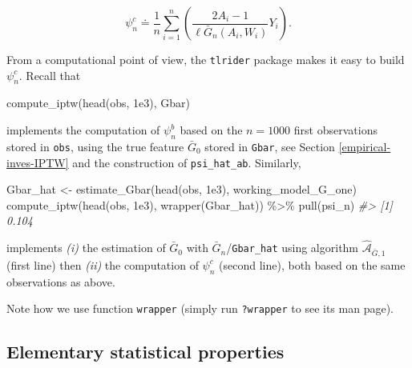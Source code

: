 \documentclass[
  11pt,
  openright,twoside]{book}
\newenvironment{Shaded}{\begin{snugshade}}{\end{snugshade}}
\newcommand{\CommentTok}[1]{\textcolor[rgb]{0.56,0.35,0.01}{\textit{#1}}}
\newcommand{\FloatTok}[1]{\textcolor[rgb]{0.00,0.00,0.81}{#1}}
\newcommand{\FunctionTok}[1]{\textcolor[rgb]{0.00,0.00,0.00}{#1}}
\newcommand{\NormalTok}[1]{#1}
\newcommand{\OtherTok}[1]{\textcolor[rgb]{0.56,0.35,0.01}{#1}}
\newcommand{\SpecialCharTok}[1]{\textcolor[rgb]{0.00,0.00,0.00}{#1}}
\newcommand{\Algo}{\widehat{\mathcal{A}}}
\newcommand{\defq}{\doteq}
\newcommand{\Gbar}{\bar{G}}
\theoremstyle{definition}
\theoremstyle{definition}
\theoremstyle{definition}
\theoremstyle{definition}
\theoremstyle{remark}
\begin{document}
\begin{equation*}
\psi_{n}^{c}   \defq   \frac{1}{n}    \sum_{i=1}^{n}   \left(\frac{2A_{i}   -
1}{\ell\Gbar_{n}(A_{i}, W_{i})} Y_{i}\right).
\end{equation*}

From a computational point of view, the \texttt{tlrider} package makes it easy to
build \(\psi_{n}^{c}\). Recall that

\begin{Shaded}
\begin{Highlighting}[]
\FunctionTok{compute\_iptw}\NormalTok{(}\FunctionTok{head}\NormalTok{(obs, }\FloatTok{1e3}\NormalTok{), Gbar)}
\end{Highlighting}
\end{Shaded}

implements the computation of \(\psi_{n}^{b}\) based on the \(n=1000\) first
observations stored in \texttt{obs}, using the true feature \(\Gbar_{0}\) stored in
\texttt{Gbar}, see Section \ref{empirical-inves-IPTW} and the construction of
\texttt{psi\_hat\_ab}. Similarly,

\begin{Shaded}
\begin{Highlighting}[]
\NormalTok{Gbar\_hat }\OtherTok{\textless{}{-}} \FunctionTok{estimate\_Gbar}\NormalTok{(}\FunctionTok{head}\NormalTok{(obs, }\FloatTok{1e3}\NormalTok{), working\_model\_G\_one)}
\FunctionTok{compute\_iptw}\NormalTok{(}\FunctionTok{head}\NormalTok{(obs, }\FloatTok{1e3}\NormalTok{), }\FunctionTok{wrapper}\NormalTok{(Gbar\_hat)) }\SpecialCharTok{\%\textgreater{}\%} \FunctionTok{pull}\NormalTok{(psi\_n)}
\CommentTok{\#\textgreater{} [1] 0.104}
\end{Highlighting}
\end{Shaded}

implements \emph{(i)} the estimation of \(\Gbar_{0}\) with \(\Gbar_{n}\)/\texttt{Gbar\_hat}
using algorithm \(\Algo_{\Gbar,1}\) (first line) then \emph{(ii)} the computation of
\(\psi_{n}^{c}\) (second line), both based on the same observations as above.

Note how we use function \texttt{wrapper} (simply run \texttt{?wrapper} to see its man
page).

\hypertarget{elementary-stat-prop-iptw}{%
\subsection{Elementary statistical properties}\label{elementary-stat-prop-iptw}}
\end{document}
